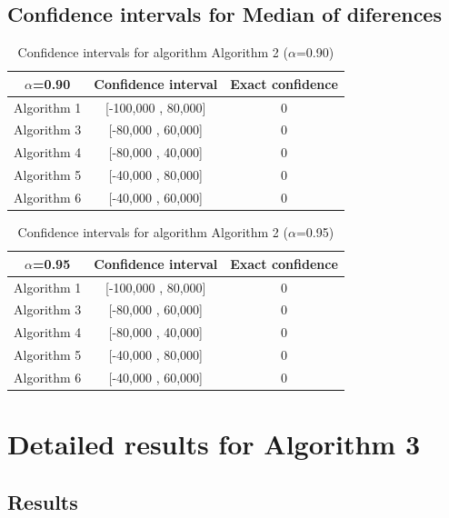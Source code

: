 \documentclass[a4paper,10pt]{article}
\begin{document}
\subsection{Confidence intervals for Median of diferences}

\begin{table}[!htp]
\centering\small
\begin{tabular}{
|c|c|c|}
\hline
 $\alpha$=0.90 & Confidence interval & Exact confidence \\ \hline 
Algorithm 1 & [-100,000 , 80,000] & 0\\ \hline 
Algorithm 3 & [-80,000 , 60,000] & 0\\ \hline 
Algorithm 4 & [-80,000 , 40,000] & 0\\ \hline 
Algorithm 5 & [-40,000 , 80,000] & 0\\ \hline 
Algorithm 6 & [-40,000 , 60,000] & 0\\ \hline 

\end{tabular}
\caption{Confidence intervals for algorithm Algorithm 2 ($\alpha$=0.90)}
\end{table}
\begin{table}[!htp]
\centering\small
\begin{tabular}{
|c|c|c|}
\hline
 $\alpha$=0.95 & Confidence interval & Exact confidence \\ \hline 
Algorithm 1 & [-100,000 , 80,000] & 0\\ \hline 
Algorithm 3 & [-80,000 , 60,000] & 0\\ \hline 
Algorithm 4 & [-80,000 , 40,000] & 0\\ \hline 
Algorithm 5 & [-40,000 , 80,000] & 0\\ \hline 
Algorithm 6 & [-40,000 , 60,000] & 0\\ \hline 

\end{tabular}
\caption{Confidence intervals for algorithm Algorithm 2 ($\alpha$=0.95)}
\end{table}

 \clearpage 


\section{Detailed results for Algorithm 3}


\subsection{Results}
\end{document}
